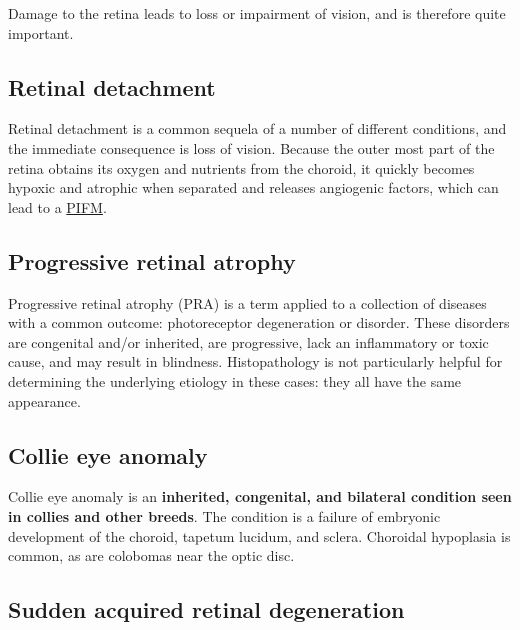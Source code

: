\documentclass[
  openany]{article}
\begin{document}
Damage to the retina leads to loss or impairment of vision, and is therefore quite important.

\hypertarget{retinal-detachment}{%
\subsection{Retinal detachment}\label{retinal-detachment}}

Retinal detachment is a common sequela of a number of different conditions, and the immediate consequence is loss of vision. Because the outer most part of the retina obtains its oxygen and nutrients from the choroid, it quickly becomes hypoxic and atrophic when separated and releases angiogenic factors, which can lead to a \protect\hyperlink{pre-iridial-fibrovascular-membranes-pifm}{PIFM}.

\hypertarget{progressive-retinal-atrophy}{%
\subsection{Progressive retinal atrophy}\label{progressive-retinal-atrophy}}

Progressive retinal atrophy (PRA) is a term applied to a collection of diseases with a common outcome: photoreceptor degeneration or disorder. These disorders are congenital and/or inherited, are progressive, lack an inflammatory or toxic cause, and may result in blindness. Histopathology is not particularly helpful for determining the underlying etiology in these cases: they all have the same appearance.

\hypertarget{collie-eye-anomaly}{%
\subsection{Collie eye anomaly}\label{collie-eye-anomaly}}

Collie eye anomaly is an \textbf{inherited, congenital, and bilateral condition seen in collies and other breeds}. The condition is a failure of embryonic development of the choroid, tapetum lucidum, and sclera. Choroidal hypoplasia is common, as are colobomas near the optic disc.

\hypertarget{sudden-acquired-retinal-degeneration}{%
\subsection{Sudden acquired retinal degeneration}\label{sudden-acquired-retinal-degeneration}}
\end{document}
